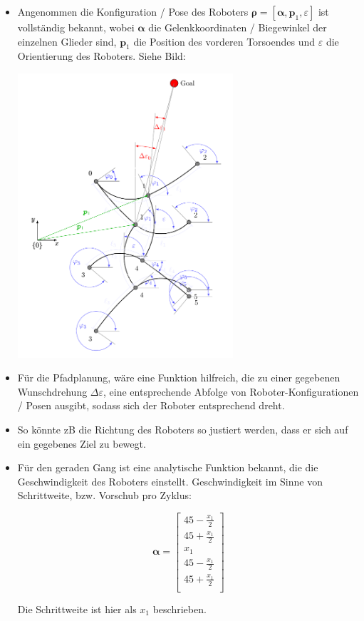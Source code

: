 \documentclass[10pt,a4paper]{article}
\begin{document}
\begin{itemize}

\item Angenommen die Konfiguration / Pose des Roboters $\bm{\rho} = [\bm{\alpha}, \bm{p}_1, \varepsilon]$ ist vollständig bekannt, wobei $\bm{\alpha}$ die Gelenkkoordinaten / Biegewinkel der einzelnen Glieder sind, $\bm{p}_1$ die Position des vorderen Torsoendes und $\varepsilon$ die Orientierung des Roboters.
Siehe Bild:

\includegraphics[width=8cm]{model.pdf}


\item Für die Pfadplanung, wäre eine Funktion hilfreich, die zu einer gegebenen Wunschdrehung $\Delta \varepsilon$, eine entsprechende Abfolge von Roboter-Konfigurationen / Posen ausgibt, sodass sich der Roboter entsprechend dreht.

\item So könnte zB die Richtung des Roboters so justiert werden, dass er sich auf ein gegebenes Ziel zu bewegt.


\item Für den geraden Gang ist eine analytische Funktion bekannt, die die Geschwindigkeit des Roboters einstellt. Geschwindigkeit im Sinne von Schrittweite, bzw. Vorschub pro Zyklus:

\begin{equation}
\bm{\alpha} = \begin{bmatrix}
45 - \frac{x_1}{2} \\
45 + \frac{x_1}{2} \\
x_1 \\
45 - \frac{x_1}{2}  \\
45 + \frac{x_1}{2} \\
\end{bmatrix}
\end{equation}

Die Schrittweite ist hier als $x_1$ beschrieben.

\end{itemize}
\end{document}
